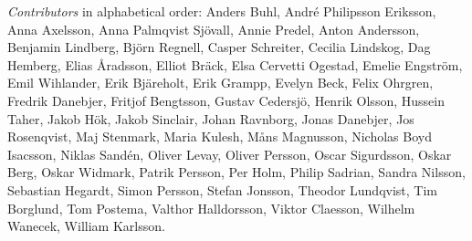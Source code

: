 \emph{Contributors} in alphabetical order:
Anders Buhl,
André Philipsson Eriksson,
Anna Axelsson,
Anna Palmqvist Sjövall,
Annie Predel,
Anton Andersson,
Benjamin Lindberg,
Björn Regnell,
Casper Schreiter,
Cecilia Lindskog,
Dag Hemberg,
Elias Åradsson,
Elliot Bräck,
Elsa Cervetti Ogestad,
Emelie Engström,
Emil Wihlander,
Erik Bjäreholt,
Erik Grampp,
Evelyn Beck,
Felix Ohrgren,
Fredrik Danebjer,
Fritjof Bengtsson,
Gustav Cedersjö,
Henrik Olsson,
Hussein Taher,
Jakob Hök,
Jakob Sinclair,
Johan Ravnborg,
Jonas Danebjer,
Jos Rosenqvist,
Maj Stenmark,
Maria Kulesh,
Måns Magnusson,
Nicholas Boyd Isacsson,
Niklas Sandén,
Oliver Levay,
Oliver Persson,
Oscar Sigurdsson,
Oskar Berg,
Oskar Widmark,
Patrik Persson,
Per Holm,
Philip Sadrian,
Sandra Nilsson,
Sebastian Hegardt,
Simon Persson,
Stefan Jonsson,
Theodor Lundqvist,
Tim Borglund,
Tom Postema,
Valthor Halldorsson,
Viktor Claesson,
Wilhelm Wanecek,
William Karlsson.
